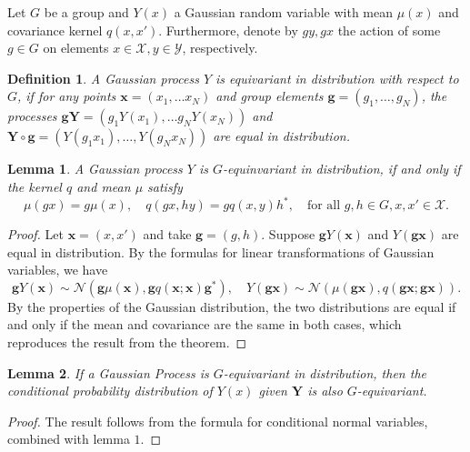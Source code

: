\documentclass{article}
\newtheorem{lemma}{Lemma}
\newtheorem{definition}{Definition}
\newcommand{\yspace}{\mathcal{Y}}
\newcommand{\xspace}{\mathcal{X}}
\begin{document}
    Let $G$ be a group and $Y(x)$ a Gaussian random variable with mean $\mu(x)$ and covariance kernel $q(x, x')$. Furthermore, denote by $gy, gx$ the action of some $g\in G$ on elements $x\in\xspace, y\in\yspace$, respectively.

    \begin{definition}
        A Gaussian process $Y$ is equivariant in distribution with respect to $G$, if for any points $\pmb x = (x_1, \dots x_N)$ and group elements $\pmb g = (g_1, \dots, g_N)$, the processes $\pmb g\pmb Y = (g_1Y(x_1),\dots g_NY(x_N))$ and $\pmb Y\circ \pmb g = (Y(g_1x_1),\dots, Y(g_Nx_N))$ are equal in distribution.
    \end{definition}

    \begin{lemma}
        A Gaussian process $Y$ is $G$-equinvariant in distribution, if and only if the kernel $q$ and mean $\mu$ satisfy
        \[
            \mu(gx) = g\mu(x), \quad q(gx, hy) = gq(x, y)h^*,\quad\text{for all }g,h\in G,x,x'\in\xspace.
        \]
    \end{lemma}
    \begin{proof}
        Let $\pmb x = (x, x')$ and take $\pmb g=(g,h)$. Suppose $\pmb g Y(\pmb x)$ and $Y(\pmb g\pmb x)$ are equal in distribution. By the formulas for linear transformations of Gaussian variables, we have
        \[
            \pmb g Y(\pmb x) \sim \mathcal{N}(\pmb g\mu(\pmb x), \pmb gq(\pmb x;\pmb x)\pmb g^*),\quad Y(\pmb g \pmb x)\sim \mathcal{N}(\mu(\pmb g\pmb x), q(\pmb g\pmb x; \pmb g\pmb x)).
        \]
        By the properties of the Gaussian distribution, the two distributions are equal if and only if the mean and covariance are the same in both cases, which reproduces the result from the theorem.
    \end{proof}

    \begin{lemma}
        If a Gaussian Process is $G$-equivariant in distribution, then the conditional probability distribution of $Y(x)$ given $\pmb Y$ is also $G$-equivariant.
    \end{lemma}

    \begin{proof}
        The result follows from the formula for conditional normal variables, combined with lemma $1$.
    \end{proof}
    
\end{document}
